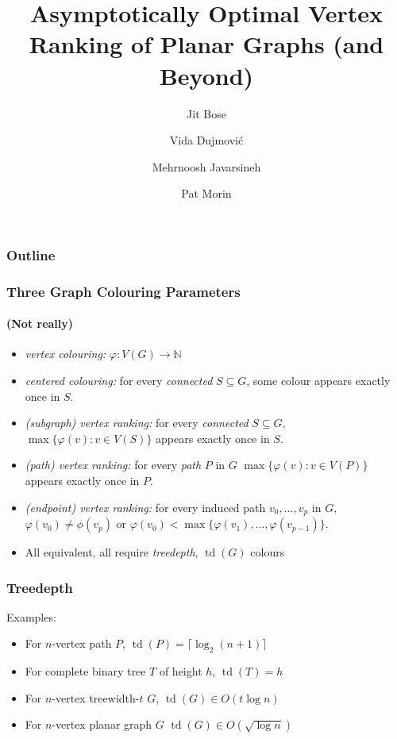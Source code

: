 \documentclass[xcolor=dvipsnames]{beamer}
\title{Asymptotically Optimal Vertex Ranking \newline of Planar Graphs (and Beyond)}
\author{Jit Bose \and Vida Dujmović \and Mehrnoosh Javarsineh \and Pat Morin}
\newcommand{\N}{\mathbb{N}}
\DeclareMathOperator{\td}{td}
\begin{document}
\begin{frame}
  \titlepage
\end{frame}

\begin{frame}
    \frametitle{Outline}

    \tableofcontents
\end{frame}

\begin{frame}
  \frametitle{Three Graph Colouring Parameters}
  \framesubtitle{(Not really)}

  \begin{itemize}
    \item \emph{vertex colouring:} $\varphi:V(G)\to\N$\vspace{.5cm}

    \item \emph{centered colouring:} for every \emph{connected} $S\subseteq G$, some colour appears exactly once in $S$.
    
    \item \emph{(subgraph) vertex ranking:} for every \emph{connected} $S\subseteq G$, $\max\{\varphi(v):v\in V(S)\}$ appears exactly once in $S$.
    
    \item \emph{(path) vertex ranking:} for every \emph{path} $P$ in $G$ $\max\{\varphi(v):v\in V(P)\}$ appears exactly once in $P$.
    
    \item \emph{(endpoint) vertex ranking:} for every induced path $v_0,\ldots,v_p$ in $G$, $\varphi(v_0)\neq \phi(v_p)$ or $\varphi(v_0)<\max\{\varphi(v_1),\ldots,\varphi(v_{p-1})\}$.\vspace{.5cm}
    
    \item<2->All equivalent, all require \emph{treedepth}, $\td(G)$ colours
  \end{itemize}
\end{frame}

\begin{frame}
  \frametitle{Treedepth}

  Examples:
  \begin{itemize}
    \item For $n$-vertex path $P$, $\td(P)=\lceil \log_2 (n+1)\rceil$
    \item For complete binary tree $T$ of height $h$, $\td(T)=h$
    \item For $n$-vertex treewidth-$t$ $G$, $\td(G)\in O(t\log n)$
    \item For $n$-vertex planar graph $G$ $\td(G)\in O(\sqrt{\log n})$
  \end{itemize}  
\end{frame}
\end{document}

